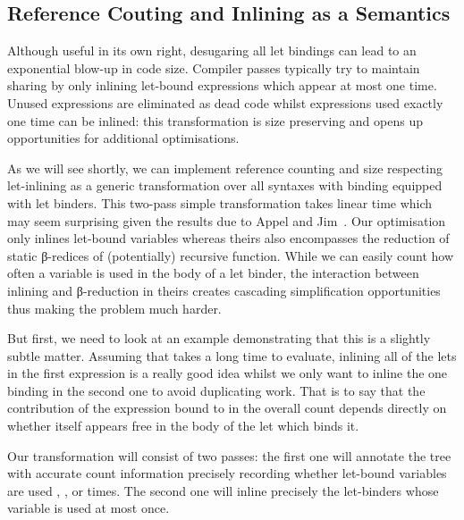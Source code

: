 \subsection{Reference Couting and Inlining as a Semantics}\label{section:inlining}

Although useful in its own right, desugaring all let bindings can lead
to an exponential blow-up in code size. Compiler passes typically try
to maintain sharing by only inlining let-bound expressions which appear
at most one time. Unused expressions are eliminated as dead code whilst
expressions used exactly one time can be inlined: this transformation is
size preserving and opens up opportunities for additional optimisations.

As we will see shortly, we can implement reference counting and size
respecting let-inlining as a generic transformation over all syntaxes
with binding equipped with let binders. This two-pass simple transformation
takes linear time which may seem surprising given the results due to Appel and
Jim~\citeyear{DBLP:journals/jfp/AppelJ97}. Our optimisation only inlines
let-bound variables whereas theirs also encompasses the reduction of static
β-redices of (potentially) recursive function. While we can easily count how
often a variable is used in the body of a let binder, the interaction between
inlining and β-reduction in theirs creates cascading simplification opportunities
thus making the problem much harder.

But first, we need to look at an example demonstrating that this is a
slightly subtle matter. Assuming that  takes a long time
to evaluate, inlining all of the lets in the first expression is a really
good idea whilst we only want to inline the one binding  in the
second one to avoid duplicating work. That is to say that the contribution
of the expression bound to  in the overall count depends directly
on whether  itself appears free in the body of the let which binds it.

\begin{figure}[h]
\begin{minipage}{0.45\textwidth}
\end{minipage}
\begin{minipage}{0.45\textwidth}
\end{minipage}
\end{figure}

Our transformation will consist of two passes: the first one will annotate
the tree with accurate count information precisely recording whether
let-bound variables are used , , or  times.
The second one will inline precisely the let-binders whose variable is
used at most once.

